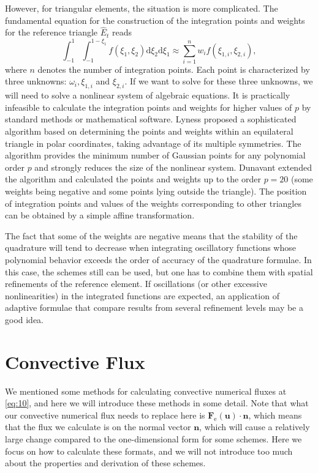 \documentclass{develop-note}
\begin{document}
However, for triangular elements, the situation is more complicated. The fundamental equation for the construction of the integration points and weights for the reference triangle $\hat{E}_{t}$ reads
\begin{equation}
  \int_{-1}^{1}\int_{-1}^{1-\xi_{1}}f(\xi_{1},\xi_{2})\mathrm{d}\xi_{2}\mathrm{d}\xi_{1}\approx\sum_{i=1}^{n}w_{i}f(\xi_{1,i},\xi_{2,i}),
\end{equation}
where $n$ denotes the number of integration points. Each point is characterized by three unknowns: $\omega_{i},\xi_{1,i}$ and $\xi_{2,i}$. If we want to solve for these three unknowns, we will need to solve a nonlinear system of algebraic equations. It is practically infeasible to calculate the integration points and weights for higher values of $p$ by standard methods or mathematical software. Lyness\cite{lynessModerateDegreeSymmetric1975} proposed a sophisticated algorithm based on determining the points and weights within an equilateral triangle in polar coordinates, taking advantage of its multiple symmetries. The algorithm provides the minimum number of Gaussian points for any polynomial order $p$ and strongly reduces the size of the nonlinear system. Dunavant\cite{dunavantHighDegreeEfficient1985} extended the algorithm and calculated the points and weights up to the order $p=20$ (some weights being negative and some points lying outside the triangle). The position of integration points and values of the weights corresponding to other triangles can be obtained by a simple affine transformation.

The fact that some of the weights are negative means that the stability of the quadrature will tend to decrease when integrating oscillatory functions whose polynomial behavior exceeds the order of accuracy of the quadrature formulae. In this case, the schemes still can be used, but one has to combine them with spatial refinements of the reference element. If oscillations (or other excessive nonlinearities) in the integrated functions are expected, an application of adaptive formulae that compare results from several refinement levels may be a good idea.

\section{Convective Flux}

We mentioned some methods for calculating convective numerical fluxes at \autoref{eq:10}, and here we will introduce these methods in some detail. Note that what our convective numerical flux needs to replace here is $\mathbf{F}_{\mathrm{e}}(\mathbf{u})\cdot\mathbf{n}$, which means that the flux we calculate is on the normal vector $\mathbf{n}$, which will cause a relatively large change compared to the one-dimensional form for some schemes. Here we focus on how to calculate these formats, and we will not introduce too much about the properties and derivation of these schemes.
\end{document}
